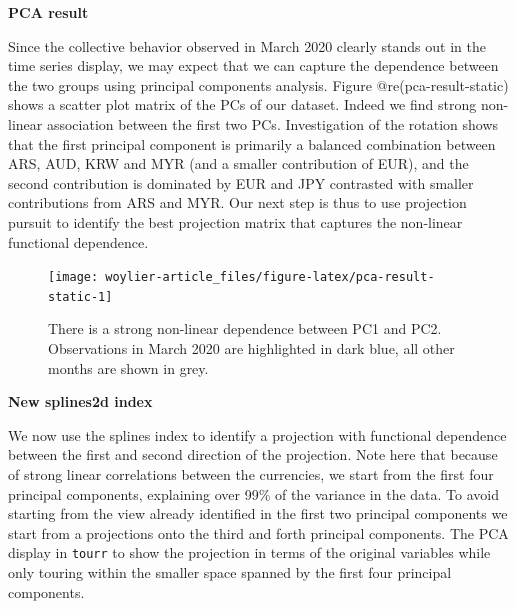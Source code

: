\textbf{PCA result}

Since the collective behavior observed in March 2020 clearly stands out in the time series display, we may expect that we can capture the dependence between the two groups using principal components analysis. Figure @re(pca-result-static)
shows a scatter plot matrix of the PCs of our dataset. Indeed we find strong non-linear association between the first two PCs. Investigation of the rotation shows that the first principal component is primarily a balanced combination between ARS, AUD, KRW and MYR (and a smaller contribution of EUR), and the second contribution is dominated by EUR and JPY contrasted with smaller contributions from ARS and MYR. Our next step is thus to use projection pursuit to identify the best projection matrix that captures the non-linear functional dependence.

\begin{figure}

{\centering \texttt{[image: woylier-article\_files/figure-latex/pca-result-static-1]} 

}

\caption{There is a strong non-linear dependence between PC1 and PC2. Observations in March 2020 are highlighted in dark blue, all other months are shown in grey.}\label{fig:pca-result-static}
\end{figure}

\textbf{New splines2d index}

We now use the splines index to identify a projection with functional dependence between the first and second direction of the projection. Note here that because of strong linear correlations between the currencies, we start from the first four principal components, explaining over 99\% of the variance in the data. To avoid starting from the view already identified in the first two principal components we start from a projections onto the third and forth principal components. The PCA display in \texttt{tourr} to show the projection in terms of the original variables while only touring within the smaller space spanned by the first four principal components.

